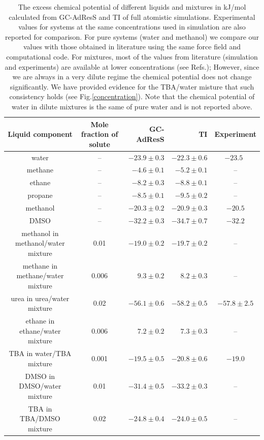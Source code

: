 \documentclass[a4paper,preprint,unsortedaddress]{revtex4-1}
\newcommand{\recheck}[1]{{\color{red} #1}}
\begin{document}
\begin{table}[]
\begin{center}
\begin{tabular}{ccrrc}
\hline \hline
 Liquid component & Mole fraction of solute & GC-AdResS & TI & Experiment \\
\hline
\recheck{water} & -- & $-23.9 \pm 0.3$  & $-22.3 \pm 0.6$ & $-23.5$~\cite{florian} \\
methane  & -- & $-4.6 \pm 0.1$  & $-5.2 \pm 0.1$ & -- \\
ethane   & -- & $-8.2 \pm 0.3$  & $-8.8 \pm 0.1$ & -- \\
propane  & -- & $-8.5 \pm 0.1$ & $-9.5 \pm 0.2$ & -- \\
\recheck{methanol}  & -- & $-20.3 \pm 0.2$ & $-20.9 \pm 0.3$ & $-20.5$ \cite{vang}  \\
DMSO & -- & $-32.2 \pm 0.3$ & $-34.7 \pm 0.7$ & $-32.2$ \cite{dmso}  \\
\recheck{methanol in methanol/water mixture} & 0.01 & $-19.0 \pm 0.2$ & $-19.7 \pm 0.2$ & -- \\
\recheck{methane in methane/water mixture} & 0.006 & $9.3 \pm 0.2$  & $8.2 \pm 0.3$ & -- \\
urea in urea/water mixture & 0.02 & $-56.1 \pm 0.6$ & $-58.2 \pm 0.5$ & $-57.8 \pm 2.5$ \cite{urea} \\
\recheck{ethane in ethane/water mixture} & 0.006 & $7.2 \pm 0.2$ & $7.3 \pm 0.3$ & -- \\ 
\recheck{TBA in water/TBA mixture} & 0.001 & $-19.5 \pm 0.5$ & $-20.8 \pm 0.6$ & $-19.0$ \cite{nico} \\
DMSO in DMSO/water mixture & 0.01 & $-31.4 \pm 0.5$ & $-33.2 \pm 0.3$ & -- \\
TBA in TBA/DMSO mixture & 0.02 & $-24.8 \pm 0.4$ & $-24.0 \pm 0.5$ & -- \\
\hline \hline
\end{tabular}
\caption{The excess chemical potential of different liquids and mixtures in kJ/mol calculated from GC-AdResS and TI of full atomistic simulations. Experimental values for systems at the same concentrations used in simulation are also reported for comparison. For pure systems (water and methanol) we compare our values with those obtained in literature using the same force field and computational code. For mixtures, most of the values from literature (simulation and experiments) are available at lower concentrations (see Refs.\cite{vang,nico}); However, since we are always in a very dilute regime the chemical potential does not change significantly. \recheck{We have provided evidence for the TBA/water misture that such consistency holds (see Fig.\ref{concentration})}. Note that the chemical potential of water in dilute mixtures is the same of pure water and is not reported above.
}
\label{table}
\end{center}
\end{table}
\end{document}
